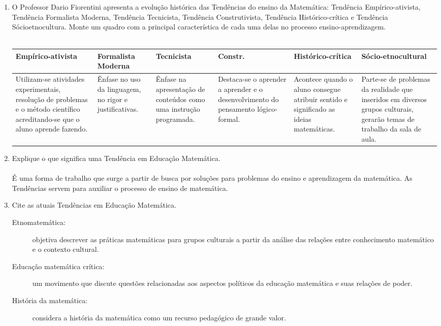 \documentclass[a4paper, 12pt]{article}
\begin{document}
\begin{enumerate}
\item O Professor Dario Fiorentini apresenta a evolução histórica das Tendências do ensino da Matemática: Tendência Empírico-ativista, Tendência Formalista Moderna, Tendência Tecnicista, Tendência Construtivista, Tendência Histórico-crítica e Tendência Sócioetnocultura. Monte um quadro com a principal característica de cada uma delas no processo ensino-aprendizagem. \\ \\
  \begin{tabular}{ | m{2cm} | m{2cm} | m{2cm} | m{2cm} | m{2cm} | m{2cm} |}
    \textbf{Empírico-ativista} & \textbf{Formalista Moderna} & \textbf{Tecnicista} & \textbf{Constr.} & \textbf{Histórico-crítica} & \textbf{Sócio-etnocultural} \\ \hline
    Utilizam-se atividades experimentais, resolução de problemas e o método científico acreditando-se que o aluno aprende fazendo. &
    Ênfase no uso da linguagem, no rigor e justificativas. &
    Ênfase na apresentação de conteúdos como uma instrução programada. &
    Destaca-se o aprender a aprender e o desenvolvimento do pensamento lógico-formal. &
    Acontece quando o aluno consegue atribuir sentido e significado as ideias matemáticas. &
    Parte-se de problemas da realidade que inseridos em diversos grupos culturais, gerarão temas de trabalho da sala de aula.
  \end{tabular}
\item Explique o que significa uma Tendência em Educação Matemática. \\ \\
  É uma forma de trabalho que surge a partir de busca por soluções para problemas do ensino e aprendizagem da matemática. As Tendências servem para auxiliar o processo de ensino de matemática.
\item Cite as atuais Tendências em Educação Matemática. 
  \begin{description}
  \item[Etnomatemática:] objetiva descrever as práticas matemáticas para grupos culturais a partir da análise das relações entre conhecimento matemático e o contexto cultural.
  \item[Educação matemática crítica:]  um movimento que discute questões relacionadas aos aspectos políticos da educação matemática e suas relações de poder.
  \item[História da matemática:]  considera a história da matemática como um recurso pedagógico de grande valor.

\end{description}
\end{enumerate}
\end{document}
